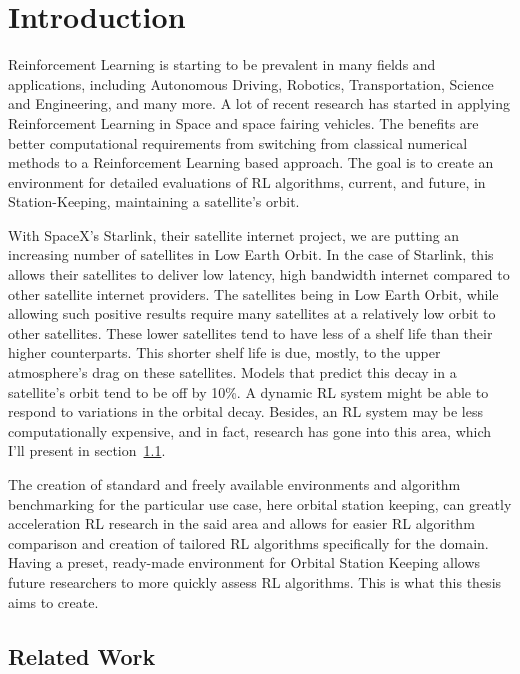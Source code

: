 \chapter{Introduction}\label{ch:intro}

Reinforcement Learning is starting to be prevalent in many fields and applications, including Autonomous Driving, Robotics, Transportation, Science and Engineering, and many more. A lot of recent research has started in applying Reinforcement Learning in Space and space fairing vehicles. The benefits are better computational requirements from switching from classical numerical methods to a Reinforcement Learning based approach. The goal is to create an environment for detailed evaluations of RL algorithms, current, and future, in Station-Keeping, maintaining a satellite's orbit.

With SpaceX's Starlink, their satellite internet project, we are putting an increasing number of satellites in Low Earth Orbit. In the case of Starlink, this allows their satellites to deliver low latency, high bandwidth internet compared to other satellite internet providers. The satellites being in Low Earth Orbit, while allowing such positive results require many satellites at a relatively low orbit to other satellites. These lower satellites tend to have less of a shelf life than their higher counterparts. This shorter shelf life is due, mostly, to the upper atmosphere's drag on these satellites. Models that predict this decay in a satellite's orbit tend to be off by 10\%. A dynamic RL system might be able to respond to variations in the orbital decay. Besides, an RL system may be less computationally expensive, and in fact, research has gone into this area, which I'll present in section~\ref{sec:relatedwork}.

The creation of standard and freely available environments and algorithm benchmarking for the particular use case, here orbital station keeping, can greatly acceleration RL research in the said area and allows for easier RL algorithm comparison and creation of tailored RL algorithms specifically for the domain. Having a preset, ready-made environment for Orbital Station Keeping allows future researchers to more quickly assess RL algorithms. This is what this thesis aims to create.

\section{Related Work}\label{sec:relatedwork}

